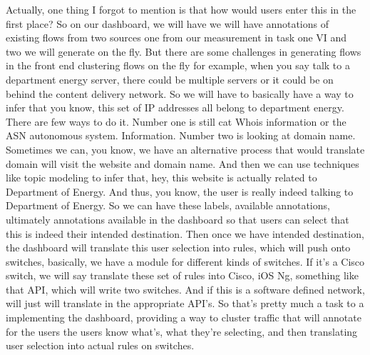 Actually, one thing I forgot to mention is that how would users enter this in the first place? So on our dashboard, we will have we will have annotations of existing flows from two sources one from our measurement in task one VI and two we will generate on the fly. But there are some challenges in generating flows in the front end clustering flows on the fly for example, when you say talk to a department energy server, there could be multiple servers or it could be on behind the content delivery network. So we will have to basically have a way to infer that you know, this set of IP addresses all belong to department energy. There are few ways to do it. Number one is still cat Whois information or the ASN autonomous system. Information. Number two is looking at domain name. Sometimes we can, you know, we have an alternative process that would translate domain will visit the website and domain name. And then we can use techniques like topic modeling to infer that, hey, this website is actually related to Department of Energy. And thus, you know, the user is really indeed talking to Department of Energy. So we can have these labels, available annotations, ultimately annotations available in the dashboard so that users can select that this is indeed their intended destination. Then once we have intended destination, the dashboard will translate this user selection into rules, which will push onto switches, basically, we have a module for different kinds of switches. If it's a Cisco switch, we will say translate these set of rules into Cisco, iOS Ng, something like that API, which will write two switches. And if this is a software defined network, will just will translate in the appropriate API's. So that's pretty much a task to a implementing the dashboard, providing a way to cluster traffic that will annotate for the users the users know what's, what they're selecting, and then translating user selection into actual rules on switches.

